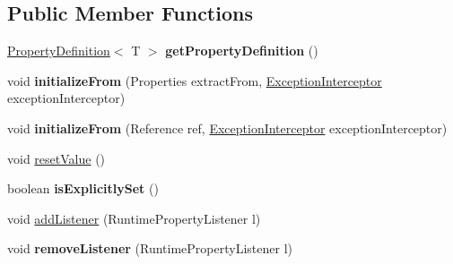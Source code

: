 \subsection*{Public Member Functions}
\begin{DoxyCompactItemize}
\item 
\mbox{\label{interfacecom_1_1mysql_1_1cj_1_1conf_1_1_runtime_property_a4bce3de7ed82bff09a896c7192148750}} 
\mbox{\hyperlink{interfacecom_1_1mysql_1_1cj_1_1conf_1_1_property_definition}{Property\+Definition}}$<$ T $>$ {\bfseries get\+Property\+Definition} ()
\item 
\mbox{\label{interfacecom_1_1mysql_1_1cj_1_1conf_1_1_runtime_property_a0ab00125bf110114bb1608e51167b4fd}} 
void {\bfseries initialize\+From} (Properties extract\+From, \mbox{\hyperlink{interfacecom_1_1mysql_1_1cj_1_1exceptions_1_1_exception_interceptor}{Exception\+Interceptor}} exception\+Interceptor)
\item 
\mbox{\label{interfacecom_1_1mysql_1_1cj_1_1conf_1_1_runtime_property_a082d6bf96ac4865da37f76b4315a2262}} 
void {\bfseries initialize\+From} (Reference ref, \mbox{\hyperlink{interfacecom_1_1mysql_1_1cj_1_1exceptions_1_1_exception_interceptor}{Exception\+Interceptor}} exception\+Interceptor)
\item 
void \mbox{\hyperlink{interfacecom_1_1mysql_1_1cj_1_1conf_1_1_runtime_property_adad737e212723fc3f3da903259377a25}{reset\+Value}} ()
\item 
\mbox{\label{interfacecom_1_1mysql_1_1cj_1_1conf_1_1_runtime_property_aba353b5735f430e108c0f727adea80a1}} 
boolean {\bfseries is\+Explicitly\+Set} ()
\item 
void \mbox{\hyperlink{interfacecom_1_1mysql_1_1cj_1_1conf_1_1_runtime_property_ad5d46f87e147c58edfa43d2d9d93967d}{add\+Listener}} (Runtime\+Property\+Listener l)
\item 
\mbox{\label{interfacecom_1_1mysql_1_1cj_1_1conf_1_1_runtime_property_a171f2224114d716cb6dfcf1dabcf4092}} 
void {\bfseries remove\+Listener} (Runtime\+Property\+Listener l)
\end{DoxyCompactItemize}


